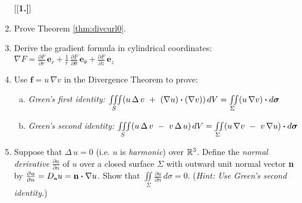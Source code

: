 \begin{enumerate}[\bfseries 1.]
[{[\bfseries 1.]}]
 \item Prove Theorem \ref{thm:divcurl0}.
 \item Derive the gradient formula in cylindrical coordinates: $\nabla F =
  \frac{\partial F}{\partial r}\,\textbf{e}_{r} +
  \frac{1}{r}\,\frac{\partial F}{\partial \theta}\,\textbf{e}_{\theta}+\frac{\partial F}{\partial z}\,\textbf{e}_{z}$
 \item Use $\textbf{f} = u\,\nabla v$ in the Divergence Theorem to prove:
  \begin{enumerate}[(a)]
   \item \emph{Green's first identity:}
    $\iiint\limits_{S} (u\,\Delta\,v ~+~ (\nabla u) \bm{\cdot} (\nabla v))\,dV =
    \iint\limits_{\Sigma} (u\,\nabla v) \bm{\cdot} d\bm{\sigma}$
   \item \emph{Green's second identity:}
    $\iiint\limits_{S} (u\,\Delta\,v ~-~ v\,\Delta\,u)\,dV =
    \iint\limits_{\Sigma} (u\,\nabla v ~-~ v\,\nabla u) \bm{\cdot} d\bm{\sigma}$
  \end{enumerate}
 \item Suppose that $\Delta\,u = 0$ (i.e. $u$ is \emph{harmonic}) over $\mathbb{R}^{3}$. Define the
  \emph{normal derivative} $\frac{\partial u}{\partial n}$ of $u$ over a closed surface
  $\Sigma$ with outward unit normal vector \textbf{n} by $\frac{\partial u}{\partial n} = D_{\scriptscriptstyle \textbf{n}}u =
  \textbf{n} \bm{\cdot} \nabla u$. Show that $\iint\limits_{\Sigma} \frac{\partial u}{\partial n} \,d\sigma = 0$.
  (\emph{Hint: Use Green's second identity.})
\end{enumerate}
